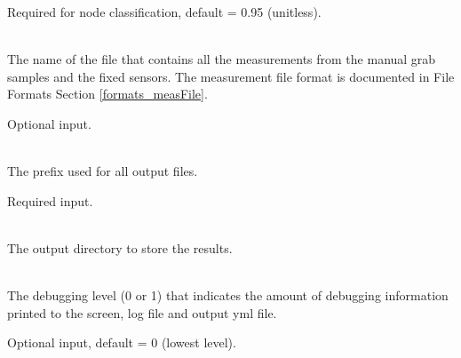 \begin{description}[topsep=0pt,parsep=0.5em,itemsep=-0.4em]
\begin{description}[topsep=0pt,parsep=0.5em,itemsep=-0.4em]
                Required for node classification, default = 0.95 (unitless).
  \end{description}
  \item[{measurements}]\hfill
  \begin{description}[topsep=0pt,parsep=0.5em,itemsep=-0.4em]
    \item[{grab samples}]\hfill
\\The name of the file that contains all the measurements from 
                the manual grab samples and the fixed sensors. The measurement file 
                format is documented in File Formats Section \ref{formats_measFile}.

                Optional input.
  \end{description}
  \item[{configure}]\hfill
  \begin{description}[topsep=0pt,parsep=0.5em,itemsep=-0.4em]
    \item[{output prefix}]\hfill
\\The prefix used for all output files.
                
                Required input.
    \item[{output directory}]\hfill
      \\The output directory to store the results.
    \item[{debug}]\hfill
\\The debugging level (0 or 1) that indicates the amount of debugging 
                information printed to the screen, log file and output yml file. 
                
                Optional input, default = 0 (lowest level).
  \end{description}
\end{description}
